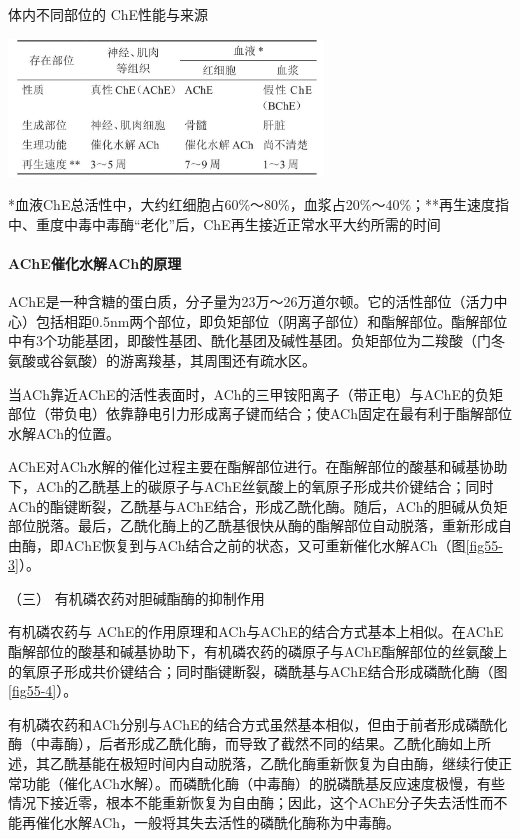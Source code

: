 \begin{table}[htbp]
\centering
\caption{体内不同部位的 ChE性能与来源}
\label{tab55-1}
\includegraphics[width=3.29167in,height=1.4375in]{./images/Image00200.jpg}
\end{table}

*血液ChE总活性中，大约红细胞占60\%～80\%，血浆占20\%～40\%；**再生速度指中、重度中毒中毒酶“老化”后，ChE再生接近正常水平大约所需的时间

\paragraph{AChE催化水解ACh的原理}

AChE是一种含糖的蛋白质，分子量为23万～26万道尔顿。它的活性部位（活力中心）包括相距0.5nm两个部位，即负矩部位（阴离子部位）和酯解部位。酯解部位中有3个功能基团，即酸性基团、酰化基团及碱性基团。负矩部位为二羧酸（门冬氨酸或谷氨酸）的游离羧基，其周围还有疏水区。

当ACh靠近AChE的活性表面时，ACh的三甲铵阳离子（带正电）与AChE的负矩部位（带负电）依靠静电引力形成离子键而结合；使ACh固定在最有利于酯解部位水解ACh的位置。

AChE对ACh水解的催化过程主要在酯解部位进行。在酯解部位的酸基和碱基协助下，ACh的乙酰基上的碳原子与AChE丝氨酸上的氧原子形成共价键结合；同时ACh的酯键断裂，乙酰基与AChE结合，形成乙酰化酶。随后，ACh的胆碱从负矩部位脱落。最后，乙酰化酶上的乙酰基很快从酶的酯解部位自动脱落，重新形成自由酶，即AChE恢复到与ACh结合之前的状态，又可重新催化水解ACh（图\ref{fig55-3}）。

\hypertarget{text00139.htmlux5cux23CHP5-3-1-1-3}{}
（三） 有机磷农药对胆碱酯酶的抑制作用

有机磷农药与
AChE的作用原理和ACh与AChE的结合方式基本上相似。在AChE酯解部位的酸基和碱基协助下，有机磷农药的磷原子与AChE酯解部位的丝氨酸上的氧原子形成共价键结合；同时酯键断裂，磷酰基与AChE结合形成磷酰化酶（图\ref{fig55-4}）。

有机磷农药和ACh分别与AChE的结合方式虽然基本相似，但由于前者形成磷酰化酶（中毒酶），后者形成乙酰化酶，而导致了截然不同的结果。乙酰化酶如上所述，其乙酰基能在极短时间内自动脱落，乙酰化酶重新恢复为自由酶，继续行使正常功能（催化ACh水解）。而磷酰化酶（中毒酶）的脱磷酰基反应速度极慢，有些情况下接近零，根本不能重新恢复为自由酶；因此，这个AChE分子失去活性而不能再催化水解ACh，一般将其失去活性的磷酰化酶称为中毒酶。

